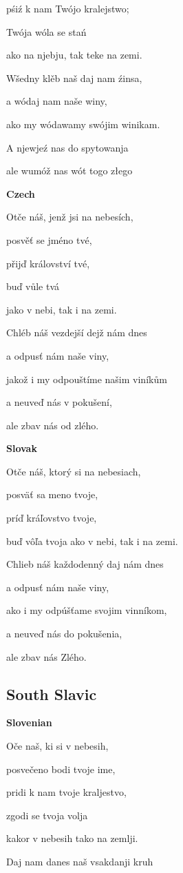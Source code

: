 pśiź k nam Twójo kralejstwo;

Twója wóla se stań

ako na njebju, tak teke na zemi.

Wšedny klěb naš daj nam źinsa,

a wódaj nam naše winy,

ako my wódawamy swójim winikam.

A njewjeź nas do spytowanja

ale wumóž nas wót togo złego

\textbf{Czech}

Otče náš, jenž jsi na nebesích,

posvěť se jméno tvé,

přijď království tvé,

buď vůle tvá

jako v nebi, tak i na zemi.

Chléb náš vezdejší dejž nám dnes

a odpusť nám naše viny,

jakož i my odpouštíme našim viníkům

a neuveď nás v pokušení,

ale zbav nás od zlého.

\textbf{Slovak}

Otče náš, ktorý si na nebesiach,

posväť sa meno tvoje,

príď kráľovstvo tvoje,

buď vôľa tvoja ako v nebi, tak i na zemi.

Chlieb náš každodenný daj nám dnes

a odpusť nám naše viny,

ako i my odpúšťame svojim vinníkom,

a neuveď nás do pokušenia,

ale zbav nás Zlého.

\subsection{South Slavic}

\textbf{Slovenian}

Oče naš, ki si v nebesih,

posvečeno bodi tvoje ime,

pridi k nam tvoje kraljestvo,

zgodi se tvoja volja 

kakor v nebesih tako na zemlji.

Daj nam danes naš vsakdanji kruh


